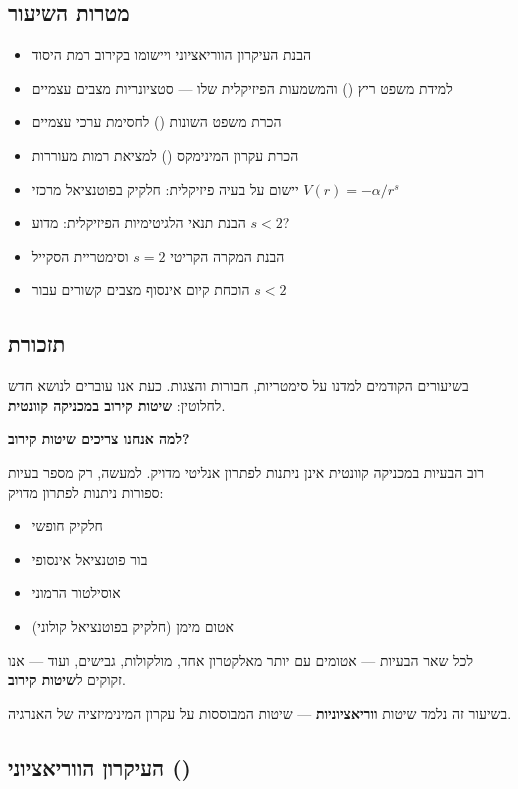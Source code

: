 \subsection*{מטרות השיעור}
\begin{itemize}
    \item הבנת העיקרון הווריאציוני ויישומו בקירוב רמת היסוד
    \item למידת משפט ריץ () והמשמעות הפיזיקלית שלו — סטציונריות מצבים עצמיים
    \item הכרת משפט השונות () לחסימת ערכי עצמיים
    \item הכרת עקרון המינימקס () למציאת רמות מעוררות
    \item יישום על בעיה פיזיקלית: חלקיק בפוטנציאל מרכזי $V(r) = -\alpha/r^s$
    \item הבנת תנאי הלגיטימיות הפיזיקלית: מדוע $s < 2$?
    \item הבנת המקרה הקריטי $s = 2$ וסימטריית הסקייל
    \item הוכחת קיום אינסוף מצבים קשורים עבור $s < 2$
\end{itemize}

\subsection*{תזכורת}

בשיעורים הקודמים למדנו על סימטריות, חבורות והצגות. כעת אנו עוברים לנושא חדש לחלוטין: \textbf{שיטות קירוב במכניקה קוונטית}.

\textbf{למה אנחנו צריכים שיטות קירוב?}

רוב הבעיות במכניקה קוונטית אינן ניתנות לפתרון אנליטי מדויק. למעשה, רק מספר בעיות ספורות ניתנות לפתרון מדויק:
\begin{itemize}
    \item חלקיק חופשי
    \item בור פוטנציאל אינסופי
    \item אוסילטור הרמוני
    \item אטום מימן (חלקיק בפוטנציאל קולוני)
\end{itemize}

לכל שאר הבעיות — אטומים עם יותר מאלקטרון אחד, מולקולות, גבישים, ועוד — אנו זקוקים ל\textbf{שיטות קירוב}.

בשיעור זה נלמד שיטות \textbf{ווריאציוניות} — שיטות המבוססות על עקרון המינימיזציה של האנרגיה.

\subsection{העיקרון הווריאציוני ()}


